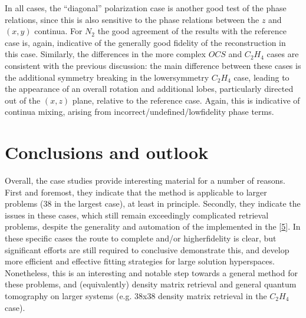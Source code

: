 \documentclass[letterpaper,table,10pt,english]{jupyterBook}
\begin{document}
\sphinxAtStartPar
In all cases, the “diagonal” polarization case is another good test of the phase relations, since this is also sensitive to the phase relations between the \(z\) and \((x,y)\) continua. For \(N_2\) the good agreement of the results with the reference case is, again, indicative of the generally good fidelity of the reconstruction in this case. Similarly, the differences in the more complex \(OCS\) and \(C_2H_4\) cases are consistent with the previous discussion: the main difference between these cases is the additional symmetry breaking in the lower\sphinxhyphen{}symmetry \(C_2H_4\) case, leading to the appearance of an overall rotation and additional lobes, particularly directed out of the \((x,z)\) plane, relative to the reference case. Again, this is indicative of continua mixing, arising from incorrect/undefined/low\sphinxhyphen{}fidelity phase terms.


\section{Conclusions and outlook}
\label{\detokenize{part2/case-study-summaries_240723:conclusions-and-outlook}}
\sphinxAtStartPar
Overall, the case studies provide interesting material for a number of reasons. First and foremost, they indicate that the {\hyperref[\detokenize{backmatter/glossary:term-bootstrap-retrieval-protocol}]{}} method is applicable to larger problems (38 {\hyperref[\detokenize{backmatter/glossary:term-radial-matrix-elements}]{}} in the largest case), at least in principle. Secondly, they indicate the issues in these cases, which still remain exceedingly complicated retrieval problems, despite the generality and automation of the {\hyperref[\detokenize{backmatter/glossary:term-bootstrap-retrieval-protocol}]{}} implemented in the  {[}\hyperlink{cite.backmatter/bibliography:id681}{5}{]}. In these specific cases the route to complete and/or higher\sphinxhyphen{}fidelity {\hyperref[\detokenize{backmatter/glossary:term-bootstrap-retrieval-protocol}]{}} is clear, but significant efforts are still required to conclusive demonstrate this, and develop more efficient and effective fitting strategies for large solution hyperspaces. Nonetheless, this is an interesting and notable step towards a general method for these problems, and (equivalently) density matrix retrieval and general quantum tomography on larger systems (e.g. 38x38 density matrix retrieval in the \(C_2H_4\) case).
\end{document}
